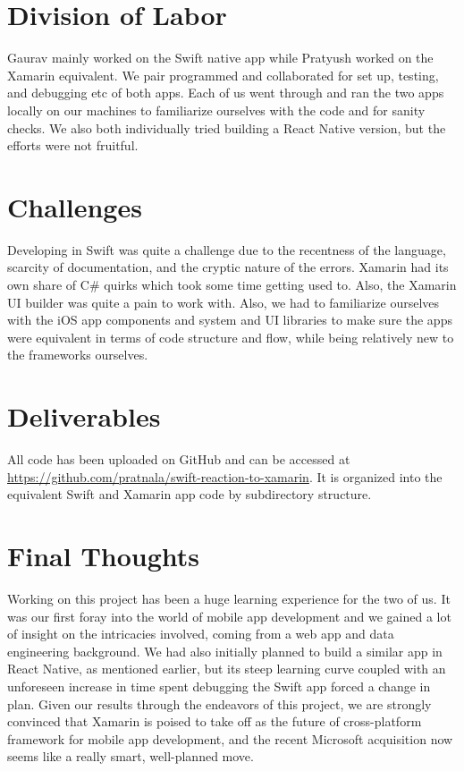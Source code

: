 \documentclass[12pt,a4paper]{article}
\begin{document}
	\section{Division of Labor}
	
	Gaurav mainly worked on the Swift native app while Pratyush worked on the Xamarin equivalent. We pair programmed and collaborated for set up, testing, and debugging etc of both apps. Each of us went through and ran the two apps locally on our machines to familiarize ourselves with the code and for sanity checks.
	We also both individually tried building a React Native version, but the efforts were not fruitful.
	
	\section{Challenges}
	
	Developing in Swift was quite a challenge due to the recentness of the language, scarcity of documentation, and the cryptic nature of the errors. Xamarin had its own share of C\# quirks which took some time getting used to. Also, the Xamarin UI builder was quite a pain to work with. Also, we had to familiarize ourselves with the iOS app components and system and UI libraries to make sure the apps were equivalent in terms of code structure and flow, while being relatively new to the frameworks ourselves.
	
	\section{Deliverables}
	
	All code has been uploaded on GitHub and can be accessed at \url{https://github.com/pratnala/swift-reaction-to-xamarin}. It is organized into the equivalent Swift and Xamarin app code by subdirectory structure.
	
	\section{Final Thoughts}
	
	Working on this project has been a huge learning experience for the two of us. It was our first foray into the world of mobile app development and we gained a lot of insight on the intricacies involved, coming from a web app and data engineering background. We had also initially planned to build a similar app in React Native, as mentioned earlier, but its steep learning curve coupled with an unforeseen increase in time spent debugging the Swift app forced a change in plan.
	Given our results through the endeavors of this project, we are strongly convinced that Xamarin is poised to take off as the future of cross-platform framework for mobile app development, and the recent Microsoft acquisition now seems like a really smart, well-planned move.
\end{document}
